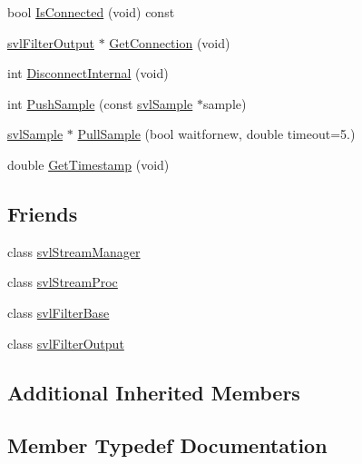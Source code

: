 \begin{DoxyCompactItemize}
bool \hyperlink{classsvl_filter_input_a14b1c5c94c6291a8b7a055ece0ded07a}{Is\+Connected} (void) const 
\item 
\hyperlink{classsvl_filter_output}{svl\+Filter\+Output} $\ast$ \hyperlink{classsvl_filter_input_a03a6e05bc85fdcff26095b39c2ec1546}{Get\+Connection} (void)
\item 
int \hyperlink{classsvl_filter_input_a6cf9edb631f4393cbfb503d831ed1678}{Disconnect\+Internal} (void)
\item 
int \hyperlink{classsvl_filter_input_a78057fb405f74be6b9f561215bec60ea}{Push\+Sample} (const \hyperlink{classsvl_sample}{svl\+Sample} $\ast$sample)
\item 
\hyperlink{classsvl_sample}{svl\+Sample} $\ast$ \hyperlink{classsvl_filter_input_ac2aa6e4fce5f216d9d99d8a8e086c401}{Pull\+Sample} (bool waitfornew, double timeout=5.)
\item 
double \hyperlink{classsvl_filter_input_a91e7586b29b8dd2a484d0a8c50045506}{Get\+Timestamp} (void)
\end{DoxyCompactItemize}
\subsection*{Friends}
\begin{DoxyCompactItemize}
\item 
class \hyperlink{classsvl_filter_input_ab5eee58544f2ce644140e932afbe32db}{svl\+Stream\+Manager}
\item 
class \hyperlink{classsvl_filter_input_a6a9ee1dec5ca263793dca09411295245}{svl\+Stream\+Proc}
\item 
class \hyperlink{classsvl_filter_input_aadcba5e897486de2d761520b866f4ac0}{svl\+Filter\+Base}
\item 
class \hyperlink{classsvl_filter_input_a3f45c3511fc124d190c8ffb5953025f6}{svl\+Filter\+Output}
\end{DoxyCompactItemize}
\subsection*{Additional Inherited Members}


\subsection{Member Typedef Documentation}
\hypertarget{classsvl_filter_input_a1439c55646b38d500a6eaf9a761bf5a2}{}
